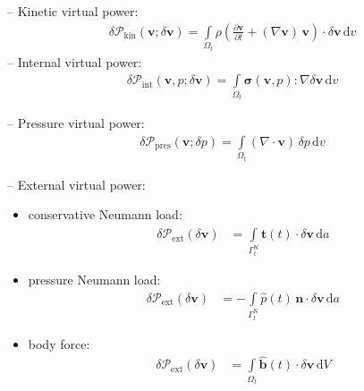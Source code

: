 \documentclass[a4paper,12pt]{report}
\newcommand{\Om}{\mathit{\Omega}}
\newcommand{\Gm}{\mathit{\Gamma}}
\begin{document}
-- Kinetic virtual power:
\begin{equation}
\label{equation-deltap-kin}
\begin{aligned}
\delta \mathcal{P}_{\mathrm{kin}}(\boldsymbol{v};\delta\boldsymbol{v}) = \int\limits_{\Om_t} \rho\left(\frac{\partial\boldsymbol{v}}{\partial t} + (\nabla\boldsymbol{v})\,\boldsymbol{v}\right) \cdot \delta\boldsymbol{v} \,\mathrm{d}v
\end{aligned}
\end{equation}
-- Internal virtual power:
\begin{equation}
\label{equation-deltap-int}
\begin{aligned}
\delta \mathcal{P}_{\mathrm{int}}(\boldsymbol{v},p;\delta\boldsymbol{v}) = 
\int\limits_{\Om_t} \boldsymbol{\sigma}(\boldsymbol{v},p) : \nabla \delta\boldsymbol{v} \,\mathrm{d}v 
\end{aligned}
\end{equation}

-- Pressure virtual power:
\begin{equation}
\label{equation-deltap-p}
\begin{aligned}
\delta \mathcal{P}_{\mathrm{pres}}(\boldsymbol{v};\delta p) = 
\int\limits_{\Om_t} (\nabla\cdot\boldsymbol{v})\,\delta p\,\mathrm{d}v
\end{aligned}
\end{equation}

-- External virtual power:\\
\begin{itemize}
\item conservative Neumann load:
\begin{equation}
\label{equation-deltap-ext-cur}
\begin{aligned}
\delta \mathcal{P}_{\mathrm{ext}}(\delta\boldsymbol{v}) &= \int\limits_{\Gm_t^{\mathrm{N}}} \hat{\boldsymbol{t}}(t) \cdot \delta\boldsymbol{v} \,\mathrm{d}a
\end{aligned}
\end{equation}
\item pressure Neumann load:
\begin{equation}
\label{equation-deltap-ext-cur-p}
\begin{aligned}
\delta \mathcal{P}_{\mathrm{ext}}(\delta\boldsymbol{v}) &= -\int\limits_{\Gm_t^{\mathrm{N}}} \hat{p}(t)\,\boldsymbol{n} \cdot \delta\boldsymbol{v} \,\mathrm{d}a
\end{aligned}
\end{equation}
\item body force:
\begin{equation}
\label{equation-deltap-ext-body}
\begin{aligned}
\delta \mathcal{P}_{\mathrm{ext}}(\delta\boldsymbol{v}) &= \int\limits_{\Om_t} \hat{\boldsymbol{b}}(t) \cdot \delta\boldsymbol{v} \,\mathrm{d}V
\end{aligned}
\end{equation}
\end{itemize}
\end{document}
